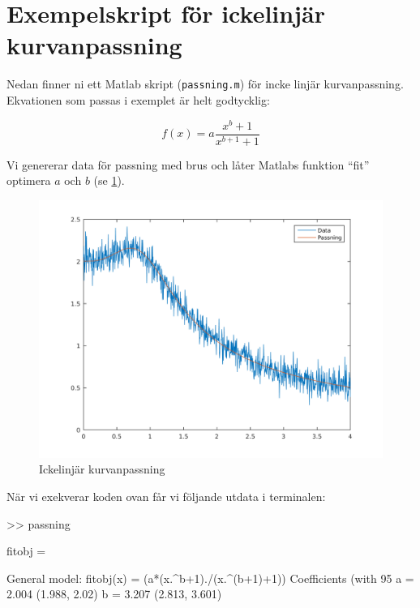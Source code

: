 \section{Exempelskript för ickelinjär kurvanpassning}
\label{sec:matlab-exempel}
Nedan finner ni ett Matlab skript ({\tt passning.m}) för incke linjär kurvanpassning.
Ekvationen som passas i exemplet är helt godtycklig:

\begin{equation}
  \label{eq:ex}
  f(x) = a\frac{x^b+1}{x^{b+1}+1}
\end{equation}

Vi genererar data för passning med brus och låter Matlabs funktion
``fit'' optimera $a$ och $b$ (se \cref{fig:matlab}).

\begin{figure}
  \centering
  \includegraphics[scale=0.5]{matlab/passning.png}
  \caption{Ickelinjär kurvanpassning}
  \label{fig:matlab}
\end{figure}


När vi exekverar koden ovan får vi följande utdata i terminalen:

\begin{terminaloutput}
>> passning

fitobj = 

     General model:
     fitobj(x) = (a*(x.^b+1)./(x.^(b+1)+1))
     Coefficients (with 95%
       a =       2.004  (1.988, 2.02)
       b =       3.207  (2.813, 3.601)
\end{terminaloutput}

